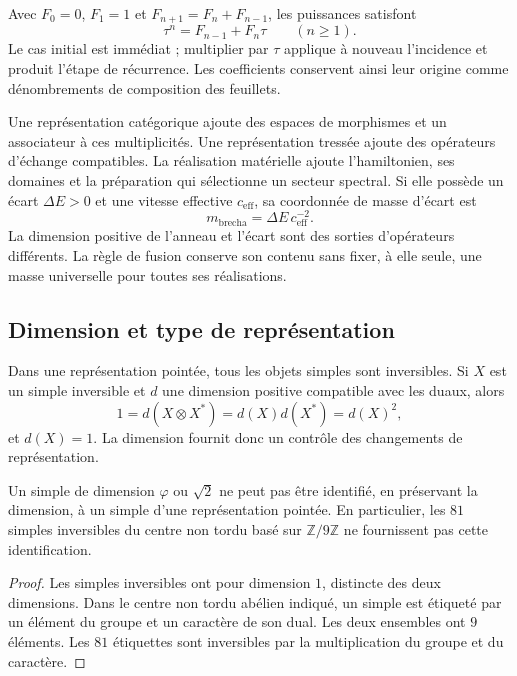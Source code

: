 Avec $F_0=0$, $F_1=1$ et $F_{n+1}=F_n+F_{n-1}$, les puissances satisfont
\[
 \tau^n=F_{n-1}+F_n\tau\qquad(n\geq1).
\]
Le cas initial est immédiat ; multiplier par $\tau$ applique à nouveau
l’incidence et produit l’étape de récurrence. Les coefficients conservent
ainsi leur origine comme dénombrements de composition des feuillets.

Une représentation catégorique ajoute des espaces de morphismes et un
associateur à ces multiplicités. Une représentation tressée ajoute
des opérateurs d’échange compatibles. La réalisation matérielle ajoute
l’hamiltonien, ses domaines et la préparation qui sélectionne un
secteur spectral. Si elle possède un écart $\Delta E>0$ et une vitesse effective
$c_{\mathrm{eff}}$, sa coordonnée de masse d’écart est
\[
 m_{\mathrm{brecha}}=\Delta E\,c_{\mathrm{eff}}^{-2}.
\]
La dimension positive de l’anneau et l’écart sont des sorties d’opérateurs
différents. La règle de fusion conserve son contenu sans fixer, à
elle seule, une masse universelle pour toutes ses réalisations.

\subsection{Dimension et type de représentation}

Dans une représentation pointée, tous les objets simples sont
inversibles. Si $X$ est un simple inversible et $d$ une dimension
positive compatible avec les duaux, alors
\[
 1=d(X\otimes X^*)=d(X)d(X^*)=d(X)^2,
\]
et $d(X)=1$. La dimension fournit donc un contrôle des
changements de représentation.

\begin{proposition}
\label{vi:prop:apuntada}
Un simple de dimension $\varphi$ ou $\sqrt2$ ne peut pas être identifié,
en préservant la dimension, à un simple d’une représentation pointée.
En particulier, les $81$ simples inversibles du centre non tordu
basé sur $\mathbb Z/9\mathbb Z$ ne fournissent pas cette identification.
\end{proposition}
\begin{proof}
Les simples inversibles ont pour dimension $1$, distincte des deux
dimensions. Dans le centre non tordu abélien indiqué, un simple est
étiqueté par un élément du groupe et un caractère de son dual. Les deux
ensembles ont $9$ éléments. Les $81$ étiquettes sont inversibles
par la multiplication du groupe et du caractère.
\end{proof}

